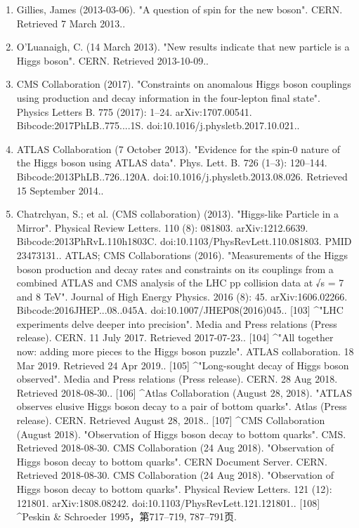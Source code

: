 \begin{enumerate}
    \item Gillies, James (2013-03-06). "A question of spin for the new boson". CERN. Retrieved 7 March 2013..
    \item O'Luanaigh, C. (14 March 2013). "New results indicate that new particle is a Higgs boson". CERN. Retrieved 2013-10-09..
    \item CMS Collaboration (2017). "Constraints on anomalous Higgs boson couplings using production and decay information in the four-lepton final state". Physics Letters B. 775 (2017): 1–24. arXiv:1707.00541. Bibcode:2017PhLB..775....1S. doi:10.1016/j.physletb.2017.10.021..
    \item ATLAS Collaboration (7 October 2013). "Evidence for the spin-0 nature of the Higgs boson using ATLAS data". Phys. Lett. B. 726 (1–3): 120–144. Bibcode:2013PhLB..726..120A. doi:10.1016/j.physletb.2013.08.026. Retrieved 15 September 2014..
    \item Chatrchyan, S.; et al. (CMS collaboration) (2013). "Higgs-like Particle in a Mirror". Physical Review Letters. 110 (8): 081803. arXiv:1212.6639. Bibcode:2013PhRvL.110h1803C. doi:10.1103/PhysRevLett.110.081803. PMID 23473131..
    ATLAS; CMS Collaborations (2016). "Measurements of the Higgs boson production and decay rates and constraints on its couplings from a combined ATLAS and CMS analysis of the LHC pp collision data at √s = 7 and 8 TeV". Journal of High Energy Physics. 2016 (8): 45. arXiv:1606.02266. Bibcode:2016JHEP...08..045A. doi:10.1007/JHEP08(2016)045..
[103]
^"LHC experiments delve deeper into precision". Media and Press relations (Press release). CERN. 11 July 2017. Retrieved 2017-07-23..
[104]
^"All together now: adding more pieces to the Higgs boson puzzle". ATLAS collaboration. 18 Mar 2019. Retrieved 24 Apr 2019..
[105]
^"Long-sought decay of Higgs boson observed". Media and Press relations (Press release). CERN. 28 Aug 2018. Retrieved 2018-08-30..
[106]
^Atlas Collaboration (August 28, 2018). "ATLAS observes elusive Higgs boson decay to a pair of bottom quarks". Atlas (Press release). CERN. Retrieved August 28, 2018..
[107]
^CMS Collaboration (August 2018). "Observation of Higgs boson decay to bottom quarks". CMS. Retrieved 2018-08-30. CMS Collaboration (24 Aug 2018). "Observation of Higgs boson decay to bottom quarks". CERN Document Server. CERN. Retrieved 2018-08-30. CMS Collaboration (24 Aug 2018). "Observation of Higgs boson decay to bottom quarks". Physical Review Letters. 121 (12): 121801. arXiv:1808.08242. doi:10.1103/PhysRevLett.121.121801..
[108]
^Peskin & Schroeder 1995，第717–719, 787–791页.

\end{enumerate}
